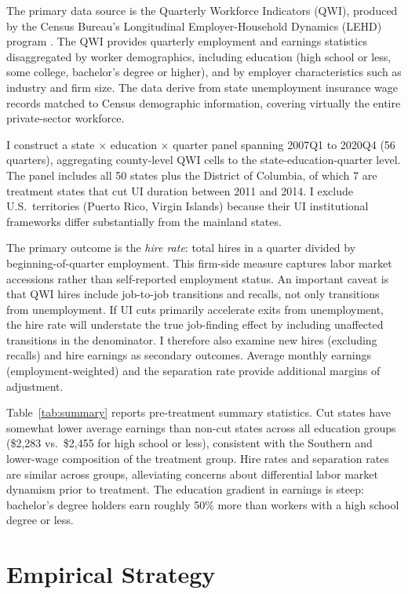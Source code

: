 \documentclass[12pt]{article}
\begin{document}
The primary data source is the Quarterly Workforce Indicators (QWI), produced by the Census Bureau's Longitudinal Employer-Household Dynamics (LEHD) program \citep{abowd2009lehd}. The QWI provides quarterly employment and earnings statistics disaggregated by worker demographics, including education (high school or less, some college, bachelor's degree or higher), and by employer characteristics such as industry and firm size. The data derive from state unemployment insurance wage records matched to Census demographic information, covering virtually the entire private-sector workforce.

I construct a state $\times$ education $\times$ quarter panel spanning 2007Q1 to 2020Q4 (56 quarters), aggregating county-level QWI cells to the state-education-quarter level. The panel includes all 50 states plus the District of Columbia, of which 7 are treatment states that cut UI duration between 2011 and 2014. I exclude U.S.\ territories (Puerto Rico, Virgin Islands) because their UI institutional frameworks differ substantially from the mainland states.

The primary outcome is the \textit{hire rate}: total hires in a quarter divided by beginning-of-quarter employment. This firm-side measure captures labor market accessions rather than self-reported employment status. An important caveat is that QWI hires include job-to-job transitions and recalls, not only transitions from unemployment. If UI cuts primarily accelerate exits from unemployment, the hire rate will understate the true job-finding effect by including unaffected transitions in the denominator. I therefore also examine new hires (excluding recalls) and hire earnings as secondary outcomes. Average monthly earnings (employment-weighted) and the separation rate provide additional margins of adjustment.



Table~\ref{tab:summary} reports pre-treatment summary statistics. Cut states have somewhat lower average earnings than non-cut states across all education groups (\$2,283 vs.\ \$2,455 for high school or less), consistent with the Southern and lower-wage composition of the treatment group. Hire rates and separation rates are similar across groups, alleviating concerns about differential labor market dynamism prior to treatment. The education gradient in earnings is steep: bachelor's degree holders earn roughly 50\% more than workers with a high school degree or less.


\section{Empirical Strategy}
\end{document}
